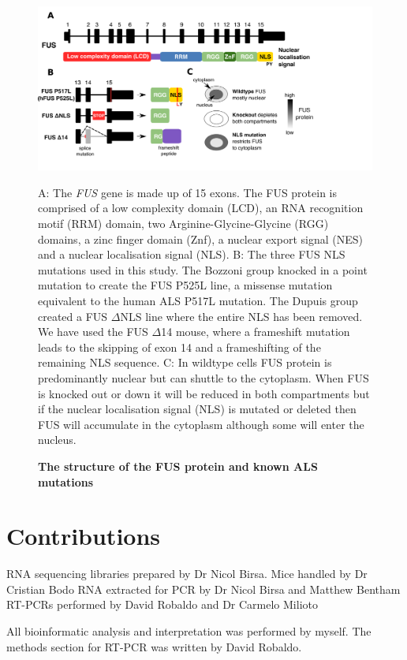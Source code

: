 \begin{figure}[h!]
	\centering
	\includegraphics[width=\textwidth]{Figures/06_fus_meta/FUS_structure_mutations.png}
	\caption{\textbf{The structure of the FUS protein and known ALS mutations}}
	A: The \textit{FUS} gene is made up of 15 exons. The FUS protein is comprised of a low complexity domain (LCD), an RNA recognition motif (RRM) domain, two Arginine-Glycine-Glycine (RGG) domains, a zinc finger domain (Znf), a nuclear export signal (NES) and a nuclear localisation signal (NLS). 
	B: The three FUS NLS mutations used in this study. The Bozzoni group knocked in a point mutation to create the FUS P525L line, a missense mutation equivalent to the human ALS P517L mutation.  The Dupuis group created a FUS $\Delta$NLS line where the entire NLS has been removed.  We have used the FUS $\Delta$14 mouse, where a frameshift mutation leads to the skipping of exon 14 and a frameshifting of the remaining NLS sequence.
	C: In wildtype  cells FUS protein is predominantly nuclear but can shuttle to the cytoplasm. When FUS is knocked out or down it will be reduced in both compartments but if the nuclear localisation signal (NLS) is mutated or deleted then FUS will accumulate in the cytoplasm although some will enter the nucleus.
	
	\label{fig:fus_structure}
\end{figure}



\section{Contributions}
RNA sequencing libraries prepared by Dr Nicol Birsa.
Mice handled by Dr Cristian Bodo
RNA extracted for PCR by Dr Nicol Birsa and Matthew Bentham
RT-PCRs performed by David Robaldo and Dr Carmelo Milioto

All bioinformatic analysis and interpretation was performed by myself. The methods section for RT-PCR was written by David Robaldo.



